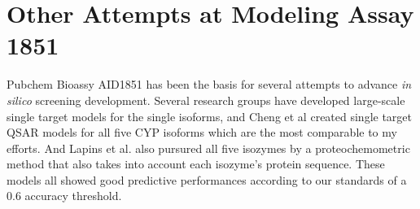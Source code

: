 



\section{Other Attempts at Modeling Assay 1851}
Pubchem Bioassy AID1851 has been the basis for several attempts to advance \textit{in silico} screening development. Several research groups have developed large-scale single target models for the single isoforms, \cite{Vasanthanathan2009, Sridhar2012, Sun2012, Novotarskyi2010} and Cheng et al created single target QSAR models for all five CYP isoforms which are the most comparable to my efforts. \cite{Cheng2011} And Lapins et al. also pursured all five isozymes by a proteochemometric method that also takes into account each isozyme's protein sequence. \cite{Lapins2013} These models all showed good predictive performances according to our standards of a 0.6 accuracy threshold.


